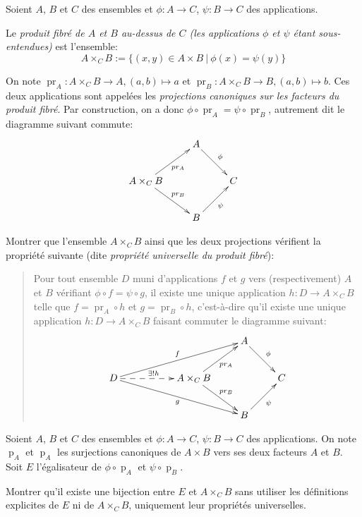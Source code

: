 \begin{exercice}\label{exo-produit-fibre}
Soient $A$, $B$ et $C$ des ensembles et $\phi : A\to C$, $\psi : B\to C$ des applications.

Le \emph{produit fibré de $A$ et $B$ au-dessus de $C$ (les applications $\phi$ et $\psi$ étant sous-entendues)} est l'ensemble:
\[
A\times_C B := \{(x,y)\in A\times B\:|\: \phi(x)=\psi(y)\}
\]

On note $\operatorname{pr}_A : A\times_C B \to A, (a,b)\mapsto a$ et $\operatorname{pr}_B : A\times_C B \to B, (a,b)\mapsto b$. Ces deux applications sont appelées les \emph{projections canoniques sur les facteurs du produit fibré}. Par construction, on a donc $\phi\circ \operatorname{pr}_A = \psi\circ \operatorname{pr}_B$, autrement dit le diagramme suivant commute:
\[ 
\xymatrix{
 & A \ar[dr]^{\phi} &\\
 A\times_C B \ar[ur]_{pr_A} \ar[dr]^{pr_B}& & C\\
 & B \ar[ur]_{\psi}&
}\]


Montrer que l'ensemble $A\times_C B$ ainsi que les deux projections vérifient la propriété suivante (dite \emph{propriété universelle du produit fibré}):
\begin{quote}
Pour tout ensemble $D$ muni d'applications $f$ et $g$ vers (respectivement) $A$ et $B$ vérifiant $\phi \circ f =  \psi\circ g$, il existe une unique application $h : D\to A\times_C B$ telle que $f =\operatorname{pr}_A \circ  h$ et $g =\operatorname{pr}_B \circ  h$, c'est-à-dire qu'il existe une unique application $h : D\to A\times_C B$ faisant commuter le diagramme suivant:
\[ 
\xymatrix{
& & & A \ar[dr]^{\phi} &\\
D \ar@{-->}[rr]^{\exists !h} \ar[urrr]^{f} \ar[drrr]_{g} & & A\times_C B \ar[ur]_{pr_A} \ar[dr]^{pr_B}& & C\\
& & & B \ar[ur]_{\psi}&
}\]
\end{quote}
\end{exercice}



\begin{exercice}
Soient $A$, $B$ et $C$ des ensembles et $\phi : A\to C$, $\psi : B\to C$ des applications. On note $\operatorname{p}_A$ et $\operatorname{p}_A$ les surjections canoniques de $A\times B$ vers ses deux facteurs $A$ et $B$. Soit $E$ l'égalisateur de $\phi \circ \operatorname{p}_A$ et $\psi \circ \operatorname{p}_B$.

Montrer qu'il existe une bijection entre $E$ et $A\times_C B$ sans utiliser les définitions explicites de $E$ ni de $A\times_C B$, uniquement leur propriétés universelles.
\end{exercice}

